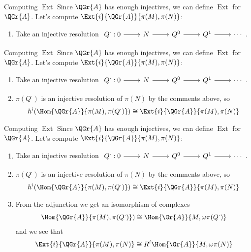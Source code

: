 \documentclass{beamer}
\theoremstyle{definition}
\begin{document}
\begin{frame}[fragile]{Computing $\operatorname{Ext}$}
  Since $\QGr{A}$ has enough injectives, we can define $\operatorname{Ext}$ for $\QGr{A}$.
  Let's compute $\Ext{i}{\QGr{A}}{\pi(M), \pi(N)}$:
  \begin{enumerate}
  \item
    Take an injective resolution $\begin{tikzcd}Q^\cdot : 0 \arrow{r} & N \arrow{r} & Q^0 \arrow{r} & Q^1 \arrow{r} & \cdots \end{tikzcd}$.
  \end{enumerate}
\end{frame}

\begin{frame}[fragile]{Computing $\operatorname{Ext}$}
  Since $\QGr{A}$ has enough injectives, we can define $\operatorname{Ext}$ for $\QGr{A}$.
  Let's compute $\Ext{i}{\QGr{A}}{\pi(M), \pi(N)}$:
  \begin{enumerate}
  \item
    Take an injective resolution $\begin{tikzcd}Q^\cdot : 0 \arrow{r} & N \arrow{r} & Q^0 \arrow{r} & Q^1 \arrow{r} & \cdots \end{tikzcd}$.
  \item
    $\pi(Q^\cdot)$ is an injective resolution of $\pi(N)$ by the comments above, so 
    $$h^i(\Hom{\QGr{A}}{\pi(M), \pi(Q^\cdot)}) \cong \Ext{i}{\QGr{A}}{\pi(M), \pi(N)}$$
  \end{enumerate}
\end{frame}

\begin{frame}[fragile]{Computing $\operatorname{Ext}$}
  Since $\QGr{A}$ has enough injectives, we can define $\operatorname{Ext}$ for $\QGr{A}$.
  Let's compute $\Ext{i}{\QGr{A}}{\pi(M), \pi(N)}$:
  \begin{enumerate}
  \item
    Take an injective resolution $\begin{tikzcd}Q^\cdot : 0 \arrow{r} & N \arrow{r} & Q^0 \arrow{r} & Q^1 \arrow{r} & \cdots \end{tikzcd}$.
  \item
    $\pi(Q^\cdot)$ is an injective resolution of $\pi(N)$ by the comments above, so $$h^i(\Hom{\QGr{A}}{\pi(M), \pi(Q^\cdot)}) \cong \Ext{i}{\QGr{A}}{\pi(M), \pi(N)}$$
  \item
    From the adjunction we get an isomorphism of complexes
    $$\Hom{\QGr{A}}{\pi(M), \pi(Q^\cdot)}) \cong \Hom{\Gr{A}}{M, \omega\pi(Q^\cdot)}$$
    and we see that 
    $$\Ext{i}{\QGr{A}}{\pi(M), \pi(N)} \cong R^i\Hom{\Gr{A}}{M, \omega\pi(N)}$$
  \end{enumerate}
\end{frame}
\end{document}
